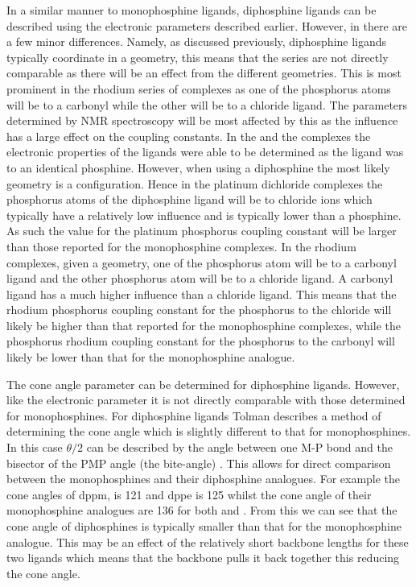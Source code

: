 In a similar manner to monophosphine ligands, diphosphine ligands can be described using the electronic parameters described earlier.  However, in there are a few minor differences.  Namely, as discussed previously, diphosphine ligands typically coordinate in a \cis{} geometry, this means that the series are not directly comparable as there will be an effect from the different geometries.  This is most prominent in the rhodium series of \ce{[Rh(CO)ClL2]} complexes as one of the phosphorus atoms will be \trans{} to a carbonyl while the other will be \trans{} to a chloride ligand.  The parameters determined by NMR spectroscopy will be most affected by this as the \trans{} influence has a large effect on the coupling constants.  In the  and the \ce{[Rh(CO)Cl(monophosphine)2]} complexes the electronic properties of the ligands were able to be determined as the ligand was \trans{} to an identical phosphine.  However, when using a diphosphine the most likely geometry is a \cis{} configuration.  Hence in the platinum dichloride complexes the phosphorus atoms of the diphosphine ligand will be \trans{} to chloride ions which typically have a relatively low \trans{} influence and is typically lower than a phosphine.  As such the value for the platinum phosphorus coupling constant will be larger than those reported for the \trans{} monophosphine complexes.  In the rhodium complexes, given a \cis{} geometry, one of the phosphorus atom will be \trans{} to a carbonyl ligand and the other phosphorus atom will be \trans{} to a chloride ligand.  A carbonyl ligand has a much higher \trans{} influence than a chloride ligand.   This means that the rhodium phosphorus coupling constant for the phosphorus \trans{} to the chloride will likely be higher than that reported for the monophosphine complexes, while the phosphorus rhodium coupling constant for the phosphorus \trans{} to the carbonyl will likely be lower than that for the monophosphine analogue.

The cone angle parameter can be determined for diphosphine ligands.  However, like the electronic parameter it is not directly comparable with those determined for monophosphines.     For diphosphine ligands Tolman describes a method of determining the cone angle which is slightly different to that for monophosphines.  In this case $\theta/2$ can be described by the angle between one M-P bond and the bisector of the PMP angle (the bite-angle) .  This allows for direct comparison between the monophosphines and their diphosphine analogues.  For example the cone angles of dppm, is 121\degrees{} and dppe is 125\degrees{} whilst the cone angle of their monophosphine analogues are 136\degrees{} for both  and .  From this we can see that the cone angle of diphosphines is typically smaller than that for the monophosphine analogue.  This may be an effect of the relatively short backbone lengths for these two ligands which means that the backbone pulls it back together this reducing the cone angle.  

